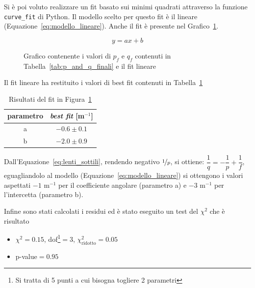 \documentclass[a4paper,12pt]{article}
\begin{document}
Si è poi voluto realizzare un fit basato sui minimi quadrati attraverso la funzione \texttt{curve\_fit} di Python. Il modello scelto per questo fit è il lineare (Equazione~\ref{eq:modello_lineare}). Anche il fit è presente nel Grafico~\ref{fig:fit_foc}.

\begin{equation}
    y = ax + b
    \label{eq:modello_lineare}
\end{equation}

\begin{figure}
    \centering
    \resizebox{0.85\textwidth}{!}{%
        
    }
    \caption{Grafico contenente i valori di $p_f$ e $q_f$ contenuti in Tabella~\ref{tab:p_and_q_finali} e il fit lineare}%
    \label{fig:fit_foc}
\end{figure}

Il fit lineare ha restituito i valori di best fit contenuti in Tabella~\ref{tab:bestfit_foc}

\begin{table}[h!]
    \centering
    \begin{tabular}{c c}
        \toprule
        parametro & \textit{best fit} [m$^{-1}$] \\
        \midrule
        a & $-0.6 \pm 0.1$ \\
        b & $-2.0 \pm 0.9$ \\
        \bottomrule
    \end{tabular}
    \caption{Risultati del fit in Figura~\ref{fig:fit_foc}}%
    \label{tab:bestfit_foc}
\end{table}

Dall'Equazione~\ref{eq:lenti_sottili}, rendendo negativo $\nicefrac{1}{p}$, si ottiene: $\dfrac{1}{q} = - \dfrac{1}{p} + \dfrac{1}{f}$, eguagliandolo al modello (Equazione~\ref{eq:modello_lineare}) si ottengono i valori aspettati $-1$ m$^{-1}$ per il coefficiente angolare (parametro a) e $-3$ m$^{-1}$ per l'intercetta (parametro b).

Infine sono stati calcolati i residui ed è stato eseguito un test del $\chi^2$ che è risultato

\begin{itemize}
    \item $\chi^2 = 0.15$, dof\footnote{Si tratta di 5 punti a cui bisogna togliere 2 parametri}$ = 3$, $\chi^2_{\text{ridotto}} = 0.05$
    \item p-value$=0.95$
\end{itemize}
\end{document}
